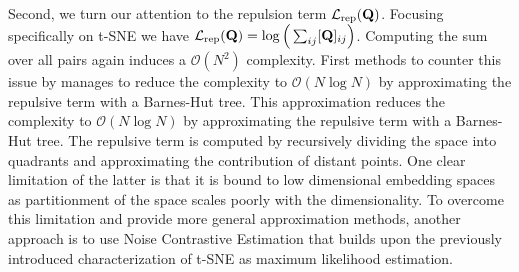 Second, we turn our attention to the repulsion term $\mathcal{L}_{\mathrm{rep}}({\mathbf{Q}})$. Focusing specifically on t-SNE we have $\mathcal{L}_{\mathrm{rep}}({\mathbf{Q}}) = \log \Big(\sum_{ij} [{\mathbf{Q}}]_{ij} \Big)$. Computing the sum over all pairs again induces a $\mathcal{O}(N^2)$ complexity. First methods to counter this issue by \cite{van2014accelerating} manages to reduce the complexity to $\mathcal{O}(N \log N)$ by approximating the repulsive term with a Barnes-Hut tree. This approximation reduces the complexity to $\mathcal{O}(N \log N)$ by approximating the repulsive term with a Barnes-Hut tree. The repulsive term is computed by recursively dividing the space into quadrants and approximating the contribution of distant points. One clear limitation of the latter is that it is bound to low dimensional embedding spaces as partitionment of the space scales poorly with the dimensionality. To overcome this limitation and provide more general approximation methods, another approach is to use Noise Contrastive Estimation \citep{gutmann2010noise} that builds upon the previously introduced characterization of t-SNE as maximum likelihood estimation.

